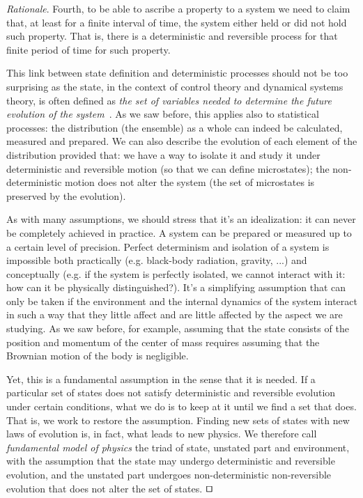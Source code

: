 \documentclass[smallextended]{svjour3}
\numberwithin{equation}{section}
\newenvironment{rationale}{\emph{Rationale}.}{\hfill\(\qed\)}
\theoremstyle{definition}
\newenvironment{rationale}{\emph{Rationale}.}{\qed}
\begin{document}
\begin{rationale}
Fourth, to be able to ascribe a property to a system we need to claim that, at least for a finite interval of time, the system either held or did not hold such property. That is, there is a deterministic and reversible process for that finite period of time for such property.

This link between state definition and deterministic processes should not be too surprising as the state, in the context of control theory and dynamical systems theory, is often defined as \emph{the set of variables needed to determine the future evolution of the system}~\cite{Katok,Sontang}. As we saw before, this applies also to statistical processes: the distribution (the ensemble) as a whole can indeed be calculated, measured and prepared. We can also describe the evolution of each element of the distribution provided that: we have a way to isolate it and study it under deterministic and reversible motion (so that we can define microstates); the non-deterministic motion does not alter the system (the set of microstates is preserved by the evolution).

As with many assumptions, we should stress that it's an idealization: it can never be completely achieved in practice. A system can be prepared or measured up to a certain level of precision. Perfect determinism and isolation of a system is impossible both practically (e.g. black-body radiation, gravity, ...) and conceptually (e.g. if the system is perfectly isolated, we cannot interact with it: how can it be physically distinguished?). It's a simplifying assumption that can only be taken if the environment and the internal dynamics of the system interact in such a way that they little affect and are little affected by the aspect we are studying. As we saw before, for example, assuming that the state consists of the position and momentum of the center of mass requires assuming that the Brownian motion of the body is negligible.

Yet, this is a fundamental assumption in the sense that it is needed. If a particular set of states does not satisfy deterministic and reversible evolution under certain conditions, what we do is to keep at it until we find a set that does. That is, we work to restore the assumption. Finding new sets of states with new laws of evolution is, in fact, what leads to new physics. We therefore call \emph{fundamental model of physics} the triad of state, unstated part and environment, with the assumption that the state may undergo deterministic and reversible evolution, and the unstated part undergoes non-deterministic non-reversible evolution that does not alter the set of states.
\end{rationale}
\end{document}
